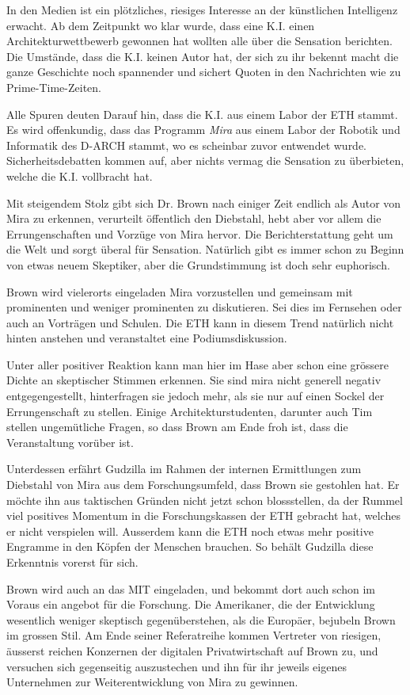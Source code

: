 \documentclass[11pt,a4paper,ngerman]{scrreprt}
\begin{document}
In den Medien ist ein plötzliches, riesiges Interesse an der künstlichen
Intelligenz erwacht. Ab dem Zeitpunkt wo klar wurde, dass eine K.I. einen
Architekturwettbewerb gewonnen hat wollten alle über die Sensation
berichten. Die Umstände, dass die K.I. keinen Autor hat, der sich zu ihr
bekennt macht die ganze Geschichte noch spannender und sichert Quoten in den
Nachrichten wie zu Prime-Time-Zeiten.

Alle Spuren deuten Darauf hin, dass die K.I. aus einem Labor der ETH
stammt. Es wird offenkundig, dass das Programm \emph{Mira} aus einem Labor der
Robotik und Informatik des D-ARCH stammt, wo es scheinbar zuvor entwendet
wurde. Sicherheitsdebatten kommen auf, aber nichts vermag die Sensation zu
überbieten, welche die K.I. vollbracht hat.

Mit steigendem Stolz gibt sich Dr. Brown nach einiger Zeit endlich als Autor
von Mira zu erkennen, verurteilt öffentlich den Diebstahl, hebt aber vor
allem die Errungenschaften und Vorzüge von Mira hervor. Die Berichterstattung
geht um die Welt und sorgt überal für Sensation. Natürlich gibt es immer
schon zu Beginn von etwas neuem Skeptiker, aber die Grundstimmung ist doch
sehr euphorisch.

Brown wird vielerorts eingeladen Mira vorzustellen und gemeinsam mit
prominenten und weniger prominenten zu diskutieren. Sei dies im Fernsehen
oder auch an Vorträgen und Schulen. Die ETH kann in diesem Trend natürlich
nicht hinten anstehen und veranstaltet eine Podiumsdiskussion.

Unter aller positiver Reaktion kann man hier im Hase aber schon eine grössere
Dichte an skeptischer Stimmen erkennen. Sie sind mira nicht generell negativ
entgegengestellt, hinterfragen sie jedoch mehr, als sie nur auf einen Sockel
der Errungenschaft zu stellen. Einige Architekturstudenten, darunter auch Tim
stellen ungemütliche Fragen, so dass Brown am Ende froh ist, dass die
Veranstaltung vorüber ist.

Unterdessen erfährt Gudzilla im Rahmen der internen Ermittlungen zum
Diebstahl von Mira aus dem Forschungsumfeld, dass Brown sie gestohlen hat. Er
möchte ihn aus taktischen Gründen nicht jetzt schon blossstellen, da der
Rummel viel positives Momentum in die Forschungskassen der ETH gebracht hat,
welches er nicht verspielen will. Ausserdem kann die ETH noch etwas mehr
positive Engramme in den Köpfen der Menschen brauchen. So behält Gudzilla
diese Erkenntnis vorerst für sich.

Brown wird auch an das MIT eingeladen, und bekommt dort auch schon im Voraus
ein angebot für die Forschung. Die Amerikaner, die der Entwicklung wesentlich
weniger skeptisch gegenüberstehen, als die Europäer, bejubeln Brown im
grossen Stil. Am Ende seiner Referatreihe kommen Vertreter von riesigen,
äusserst reichen Konzernen der digitalen Privatwirtschaft auf Brown zu, und
versuchen sich gegenseitig auszustechen und ihn für ihr jeweils eigenes
Unternehmen zur Weiterentwicklung von Mira zu gewinnen.
\end{document}
